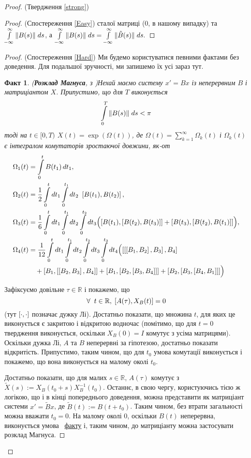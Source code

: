 \documentclass[14pt]{extarticle} %
\let\oldforall\forall
\renewcommand{\forall}{\oldforall\;}
\newtheorem*{fact}{Факт}
\theoremstyle{remark}
\begin{document}
\begin{proof}{(Твердження \ref{strong})}
\begin{proof}{(Спостереження \ref{Easy})}
	сталої матриці (0, в нашому випадку) та $\int_{-\infty}^\infty\mynorm{B(s)}\;ds$, а $\int_{-\infty}^\infty\mynorm{B(s)}\;ds=
	\int_{-\infty}^\infty\mynorm{\tilde{B}(s)}\;ds.$
\end{proof}
\begin{proof}{(Спостереження \ref{Hard})}
	Ми будемо користуватися певними фактами без доведення. Для подальшої зручності, ми запишемо їх усі зараз тут.
	\begin{fact}{(\textbf{Розклад Магнуса},
		з \cite{moan})}\label{MagnusConvergenceFact}
		Нехай маємо систему $x'=Bx$ із неперервним $B$ і матриціантом $X$. Припустимо, що для $T$ виконується
		\[\int_0^T\mynorm{B(s)}\;ds<\pi\]
		тоді на $t\in[0,T)$ $X(t)=\exp(\Omega(t))$, де $\Omega(t)=\sum\limits_{k=1}^\infty\Omega_k(t)$ і $\Omega_k(t)$ є інтегралом 
		комутаторів зростаючої довжини, як-от
		\begin{align*}
		\Omega_1(t) &= \int_0^t B(t_1)\,dt_1, \\
		\Omega_2(t) &= \frac{1}{2}\int_0^t dt_1 \int_0^{t_1} dt_2\ \left[  B(t_1),B(t_2)\right], \\
		\Omega_3(t) &= \frac{1}{6} \int_0^t dt_1 \int_0^{t_1}d t_2 \int_0^{t_2} dt_3
		\Bigl(\left[B(t_1),\left[B(t_2),B(t_3)\right]\right]+\left[B(t_3),\left[  B(t_2),B(t_{1})\right]\right]\Bigr), \\
		\Omega_4(t) &= \frac{1}{12} \int_0^t dt_1 \int_0^{t_1}d t_2 \int_0^{t_2} dt_3 \int_0^{t_3} dt_4
		\Bigl(\left[\left[\left[B_1,B_2\right],B_3\right],B_4\right] \\
		&\quad+\left[B_1,\left[\left[B_2,B_3\right],B_4\right]\right]
		+\left[B_1,\left[B_2,\left[B_3,B_4\right]\right]\right]
		+\left[B_2,\left[B_3,\left[B_4,B_1\right]\right]\right]\Bigr)
		\end{align*}
	\end{fact}
	Зафіксуємо довільне $\tau\in\mathbb{R}$ і покажемо, що
	\[\forall t\in\mathbb{R},\;\mysbra{A(\tau),X_B(t)}=0\]
	(тут $\left[\cdot,\cdot\right]$ позначає дужку Лі). Достатньо показати, що множина $t$, для яких це виконується є закритою і відкритою
	водночас (помітимо, що для $t=0$ твердження виконується, оскільки $X_B(0)=I$ комутує з усіма матрицями).
	Оскільки дужка Лі, $A$ та $B$ неперервні за гіпотезою, достатньо показати відкритість. Припустимо, таким чином, що для $t_0$ умова 
	комутації виконується і покажемо, що вона виконується на малому околі $t_0$.

	Достатньо показати, що для малих $s\in\mathbb{R}$, $A(\tau)$ комутує з $\tilde{X}(s):=X_B(t_0+s)X_B^{-1}(t_0)$. Останнє, в свою чергу,
	користуючись тією ж логікою, що і в кінці попереднього доведення, можна представити як матриціант системи $x'=\tilde{B}x$, де
	$\tilde{B}(t):=B(t+t_0)$. Таким чином, без втрати загальності можна вважати $t_0=0$. На малому околі 0, оскільки $B(t)$ неперервна,
	виконується умова ~\hyperref[MagnusConvergenceFact]{факту} і, таким чином, до матриціанту можна застосувати розклад Магнуса. 
	

\end{proof}
\end{proof}
\end{document}

